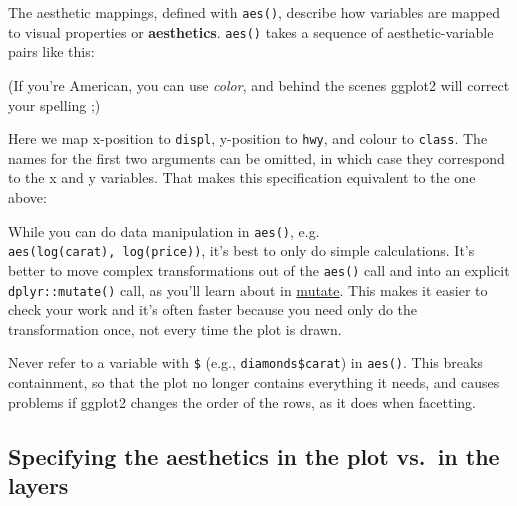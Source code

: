 The aesthetic mappings, defined with \texttt{aes()}, describe how
variables are mapped to visual properties or \textbf{aesthetics}.
\texttt{aes()} takes a sequence of aesthetic-variable pairs like this:
 

\begin{Shaded}
\begin{Highlighting}[]
\NormalTok{(}
\end{Highlighting}
\end{Shaded}

(If you're American, you can use \emph{color}, and behind the scenes
ggplot2 will correct your spelling ;)

Here we map x-position to \texttt{displ}, y-position to \texttt{hwy},
and colour to \texttt{class}. The names for the first two arguments can
be omitted, in which case they correspond to the x and y variables. That
makes this specification equivalent to the one above:

\begin{Shaded}
\begin{Highlighting}[]
\end{Highlighting}
\end{Shaded}

While you can do data manipulation in \texttt{aes()}, e.g.
\texttt{aes(log(carat),\ log(price))}, it's best to only do simple
calculations. It's better to move complex transformations out of the
\texttt{aes()} call and into an explicit \texttt{dplyr::mutate()} call,
as you'll learn about in \protect\hyperlink{mutate}{mutate}. This makes
it easier to check your work and it's often faster because you need only
do the transformation once, not every time the plot is drawn.

Never refer to a variable with \texttt{\$} (e.g.,
\texttt{diamonds\$carat}) in \texttt{aes()}. This breaks containment, so
that the plot no longer contains everything it needs, and causes
problems if ggplot2 changes the order of the rows, as it does when
facetting. \indexc{\$}

\hypertarget{sub:plots-and-layers}{%
\subsection{Specifying the aesthetics in the plot vs.~in the
layers}\label{sub:plots-and-layers}}

